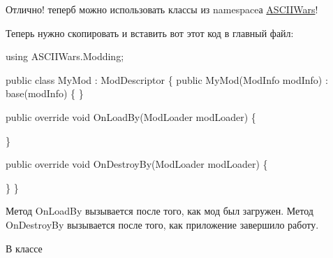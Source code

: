 {\ttfamily  Отлично! теперб можно использовать классы из namespace\textquotesingle{}а {\ttfamily \hyperlink{namespace_a_s_c_i_i_wars}{A\+S\+C\+I\+I\+Wars}}!
\begin{DoxyEnumerate}
\item Теперь нужно скопировать и вставить вот этот код в главный файл\+: 
\begin{DoxyCode}
using ASCIIWars.Modding;

public class MyMod : ModDescriptor \{
    public MyMod(ModInfo modInfo) : base(modInfo) \{ \}

    public override void OnLoadBy(ModLoader modLoader) \{

    \}

    public override void OnDestroyBy(ModLoader modLoader) \{

    \}
\}
\end{DoxyCode}


Метод {\ttfamily On\+Load\+By} вызывается после того, как мод был загружен. Метод {\ttfamily On\+Destroy\+By} вызывается после того, как приложение завершило работу.

В классе 
\end{DoxyEnumerate}}